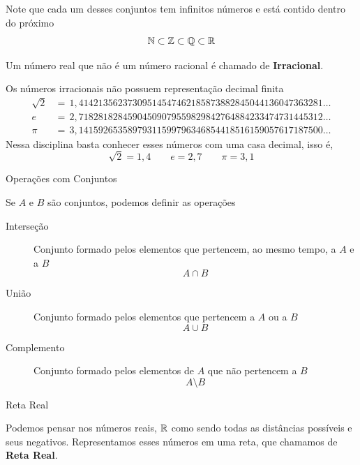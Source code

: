 \begin{teoria}{}
    Note que cada um desses conjuntos tem infinitos números e está contido dentro do próximo
    \[ \mathbb{N} \subset \mathbb{Z} \subset \mathbb{Q} \subset \mathbb{R} \]
\end{teoria}    

\begin{teoria}{}
    Um número real que não é um número racional é chamado de \textbf{Irracional}. 

    Os números irracionais não possuem representação decimal finita
    \begin{align*}
            \sqrt{2} & =\,1,41421356237309514547462185873882845044136047363281\dots \\
            e        & =\,2,71828182845904509079559829842764884233474731445312\dots \\
            \pi      & =\,3,14159265358979311599796346854418516159057617187500\dots
    \end{align*}
    Nessa disciplina basta conhecer esses números com uma casa decimal, isso é,
    \[\sqrt{2}=1,4 \qquad e=2,7 \qquad \pi=3,1\]
\end{teoria}

\begin{teoria}{Operações com Conjuntos}
    
    Se $A$ e $B$ são conjuntos, podemos definir as operações 
    \begin{description}
        \item[Interseção]  Conjunto formado pelos elementos que pertencem, ao mesmo tempo, a $A$ e a $B$
        \[A\cap B\]
        \item[União]       Conjunto formado pelos elementos que pertencem a $A$ ou a $B$
        \[A\cup B\]
        \item[Complemento] Conjunto formado pelos elementos de $A$ que não pertencem a $B$
        \[A\setminus B\]
    \end{description}
\end{teoria}

\begin{teoria}{Reta Real}
    
    Podemos pensar nos números reais, $\mathbb{R}$ como sendo todas as distâncias possíveis e seus negativos. 
    Representamos esses números em uma reta, que chamamos de \textbf{Reta Real}.
    
    
\end{teoria}

